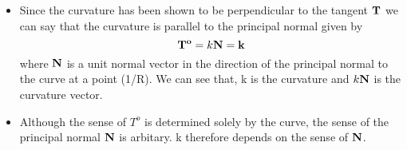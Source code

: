 	\begin{frame}
		\begin{itemize}
			\item Since the curvature has been shown to be perpendicular to the tangent $\mathbf{T}$ we can say that the curvature is parallel to the principal normal given by
			\begin{equation}
				\mathbf{T^o} = k \mathbf{N} = \mathbf{k}
			\end{equation}
			where $\mathbf{N}$ is a unit normal vector in the direction of the principal normal to the curve at a point (1/R). We can see that, k is the curvature and $k\mathbf{\mathbf{N}}$ is the curvature vector.
			\item Although the sense of $T^o$ is determined solely by the curve, the sense of the principal normal $\mathbf{N }$ is arbitary. k therefore depends on the sense of $\mathbf{N}$.
	\end{itemize}
	\end{frame}

